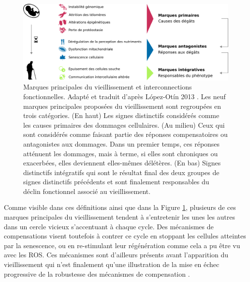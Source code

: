 \begin{figure}[h!]
    \centering
    \includegraphics[width=\textwidth]{img/intro/4_aging/intro_4_aging_Lopez-Otin_hallmarks.pdf}
    \caption[Marques principales du vieillissement et interconnections fonctionnelles]{Marques principales du vieillissement et interconnections fonctionnelles. Adapté et traduit d'après López-Otín 2013 \cite{Lopez-Otin2013} \footnotemark. Les neuf marques principales proposées du vieillissement sont regroupées en trois catégories. (En haut) Les signes distinctifs considérés comme les causes primaires des dommages cellulaires. (Au milieu) Ceux qui sont considérés comme faisant partie des réponses compensatoires ou antagonistes aux dommages. Dans un premier temps, ces réponses atténuent les dommages, mais à terme, si elles sont chroniques ou exacerbées, elles deviennent elles-mêmes délétères. (En bas) Signes distinctifs intégratifs qui sont le résultat final des deux groupes de signes distinctifs précédents et sont finalement responsables du déclin fonctionnel associé au vieillissement.}
    \label{fig:hallmarks_aging}
\end{figure}


Comme visible dans ces définitions ainsi que dans la Figure \ref{fig:hallmarks_aging}, plusieurs de ces marques principales du vieillissement tendent à s'entretenir les unes les autres dans un cercle vicieux s'accentuant à chaque cycle. Des mécanismes de compensations visent toutefois à contrer ce cycle en stoppant les cellules atteintes par la senescence, ou en re-stimulant leur régénération comme cela a pu être vu avec les ROS. Ces mécanismes sont d'ailleurs présents avant l'apparition du vieillissement qui n'est finalement qu'une illustration de la mise en échec progressive de la robustesse des mécanismes de compensation \cite{Ferrucci2020Feb}.





